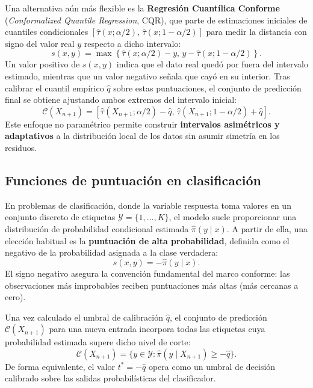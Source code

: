 Una alternativa aún más flexible es la \textbf{Regresión Cuantílica Conforme} (\textit{Conformalized Quantile Regression}, CQR), que parte de estimaciones iniciales de cuantiles condicionales $[\hat{\tau}(x; \alpha/2), \, \hat{\tau}(x; 1 - \alpha/2)]$ para medir la distancia con signo del valor real $y$ respecto a dicho intervalo:
\begin{equation}
    s(x, y) = \max \left\{ \hat{\tau}(x; \alpha/2) - y, \, y - \hat{\tau}(x; 1 - \alpha/2) \right\}.
\end{equation}
Un valor positivo de $s(x,y)$ indica que el dato real quedó por fuera del intervalo estimado, mientras que un valor negativo señala que cayó en su interior. Tras calibrar el cuantil empírico $\hat{q}$ sobre estas puntuaciones, el conjunto de predicción final se obtiene ajustando ambos extremos del intervalo inicial:
\begin{equation}
    \mathcal{C}(X_{n+1}) = \left[ \hat{\tau}(X_{n+1}; \alpha/2) - \hat{q}, \, \hat{\tau}(X_{n+1}; 1 - \alpha/2) + \hat{q} \right].
\end{equation}
Este enfoque no paramétrico permite construir \textbf{intervalos asimétricos y adaptativos} a la distribución local de los datos sin asumir simetría en los residuos.

\subsection{Funciones de puntuación en clasificación}

En problemas de clasificación, donde la variable respuesta toma valores en un conjunto discreto de etiquetas $\mathcal{Y} = \{1, \dots, K\}$, el modelo suele proporcionar una distribución de probabilidad condicional estimada $\hat{\pi}(y \mid x)$. A partir de ella, una elección habitual es la \textbf{puntuación de alta probabilidad}, definida como el negativo de la probabilidad asignada a la clase verdadera:
\begin{equation}
    s(x, y) = -\hat{\pi}(y \mid x).
\end{equation}
El signo negativo asegura la convención fundamental del marco conforme: las observaciones más improbables reciben puntuaciones más altas (más cercanas a cero).

Una vez calculado el umbral de calibración $\hat{q}$, el conjunto de predicción $\mathcal{C}(X_{n+1})$ para una nueva entrada incorpora todas las etiquetas cuya probabilidad estimada supere dicho nivel de corte:
\begin{equation}
    \mathcal{C}(X_{n+1}) = \{y \in \mathcal{Y} : \hat{\pi}(y \mid X_{n+1}) \ge -\hat{q}\}.
\end{equation}
De forma equivalente, el valor $t^* = -\hat{q}$ opera como un umbral de decisión calibrado sobre las salidas probabilísticas del clasificador.

